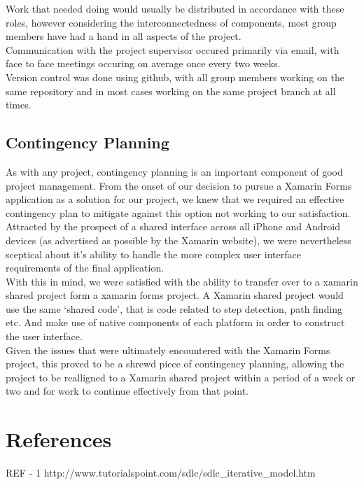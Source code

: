 \documentclass[main.tex]{subfiles}
\begin{document}
Work that needed doing would usually be distributed in accordance with these roles, however considering the interconnectedness of components, most group members have had a hand in all aspects of the project. \\

Communication with the project supervisor occured primarily via email, with face to face meetings occuring on average once every two weeks. \\

Version control was done using github, with all group members working on the same repository and in most cases working on the same project branch at all times.\\

\subsection{Contingency Planning}

As with any project, contingency planning is an important component of good project management. From the onset of our decision to pursue a Xamarin Forms application as a solution for our project, we knew that we required an effective contingency plan to mitigate against this option not working to our satisfaction. Attracted by the prospect of a shared interface across all iPhone and Android devices (as advertised as possible by the Xamarin website), we were nevertheless sceptical about it's ability to handle the more complex user interface requirements of the final application.\\

With this in mind, we were satisfied with the ability to transfer over to a xamarin shared project form a xamarin forms project. A Xamarin shared project would use the same `shared code', that is code related to step detection, path finding etc. And make use of native components of each platform in order to construct the user interface.\\

Given the issues that were ultimately encountered with the Xamarin Forms project, this proved to be a shrewd piece of contingency planning, allowing the project to be realligned to a Xamarin shared project within a period of a week or two and for work to continue effectively from that point.\\

\section{References}

REF - 1 http://www.tutorialspoint.com/sdlc/sdlc\_iterative\_model.htm
\end{document}
